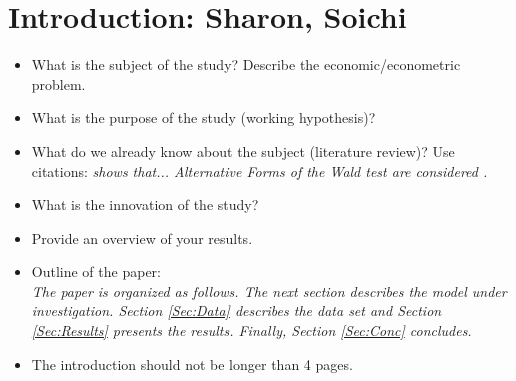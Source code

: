 \section{Introduction: Sharon, Soichi}

\begin{itemize}

    \item What is the subject of the study? Describe the
        economic/econometric problem.

    \item What is the purpose of the study (working hypothesis)?

    \item What do we already know about the subject (literature
        review)? Use citations: {\it \citet{Gallant:87} shows that...
        Alternative Forms of the Wald test are considered
        \citep{Breusch&Schmidt:88}.}

    \item What is the innovation of the study?

    \item Provide an overview of your results.


    \item Outline of the paper:\\
        {\it The paper is organized as follows. The next section describes the
        model under investigation. Section \ref{Sec:Data} describes the data set
        and Section \ref{Sec:Results} presents the results. Finally, Section
        \ref{Sec:Conc} concludes.}

    \item The introduction should not be longer than 4 pages.

\end{itemize}
